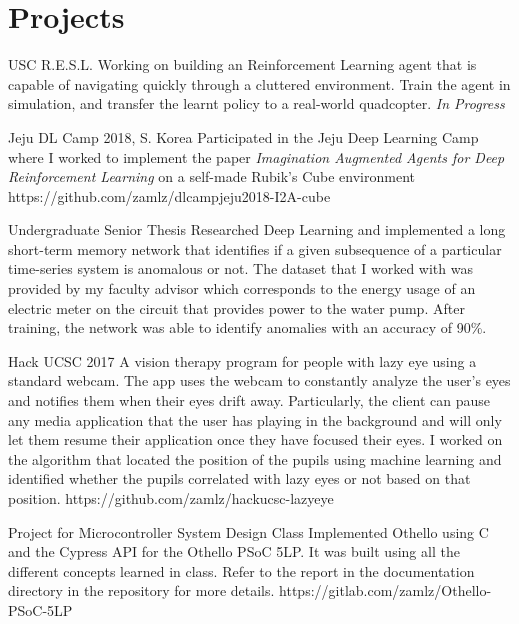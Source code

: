 \documentclass{cv}
\begin{document}
\section{Projects}
\begin{adjustwidth}{0.5cm}{0.5cm}

{USC R.E.S.L.}
{Working on building an Reinforcement Learning agent that is capable of
navigating quickly through a cluttered environment. Train the agent in
simulation, and transfer the learnt policy to a real-world quadcopter.
\textit{In Progress}}{}

{Jeju DL Camp 2018, S. Korea}
{Participated in the Jeju Deep Learning Camp where I worked to
implement the paper \textit{Imagination Augmented Agents for
Deep Reinforcement Learning} on a self-made Rubik's Cube environment}
{https://github.com/zamlz/dlcampjeju2018-I2A-cube}

{Undergraduate Senior Thesis}
{Researched Deep Learning and implemented a long short-term memory
network that identifies if a given subsequence of a particular
time-series system is anomalous or not. The dataset that I worked with
was provided by my faculty advisor which corresponds to the energy usage
of an electric meter on the circuit that provides power to the water
pump. After training, the network was able to identify anomalies with
an accuracy of 90\%.}{}

{Hack UCSC 2017}
{A vision therapy program for people with lazy eye using a standard
webcam. The app uses the webcam to constantly analyze the user's eyes
and notifies them when their eyes drift away. Particularly, the client
can pause any media application that the user has playing in the
background and will only let them resume their application once they
have focused their eyes. I worked on the algorithm that located the
position of the pupils using machine learning and identified whether
the pupils correlated with lazy eyes or not based on that position.}
{https://github.com/zamlz/hackucsc-lazyeye}

{Project for Microcontroller System Design Class}
{Implemented Othello using C and the Cypress API for the Othello PSoC 5LP.
It was built using all the different concepts learned in class. Refer to the
report in the documentation directory in the repository for more details.}
{https://gitlab.com/zamlz/Othello-PSoC-5LP}


\end{adjustwidth}
\end{document}
